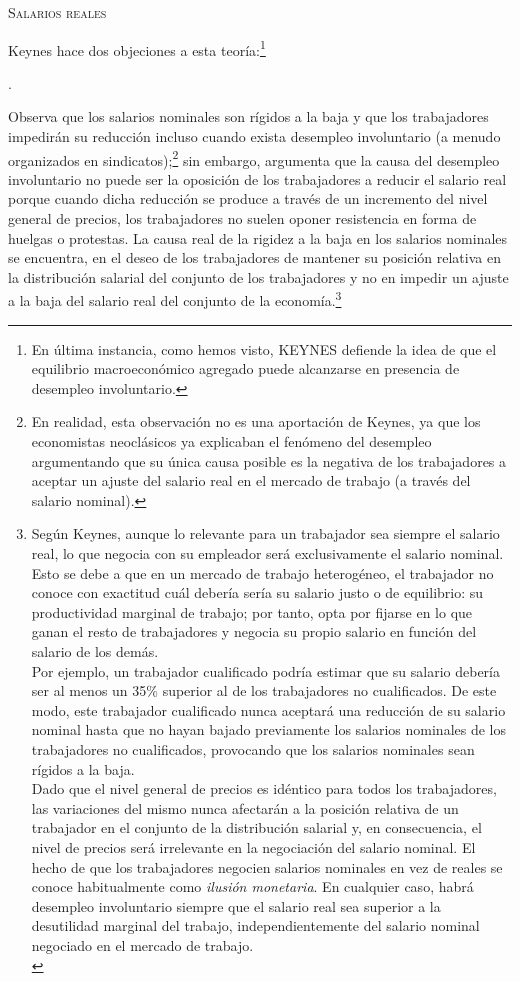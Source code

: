 \documentclass[10pt,a4paper]{article}
\newcounter{numitem}
\newenvironment{lnum}
      {\begin{list}{\arabic{numitem}.}{%
          \usecounter{numitem}%
          \setlength{\leftmargin}{1cm}%
          \setlength{\parskip}{3pt}%
          \setlength{\itemsep}{0pt}%
          \setlength{\parsep}{0pt}%
      }}
      {\end{list}}
\begin{document}
\textsc{Salarios reales}

Keynes hace dos objeciones a esta teoría:\footnote{%
    En última instancia, como hemos visto, KEYNES defiende la idea de que el equilibrio macroeconómico agregado puede alcanzarse en presencia de desempleo involuntario.
}
\begin{lnum}
    \item Observa que los salarios nominales son rígidos a la baja y que los trabajadores impedirán su reducción incluso cuando exista desempleo involuntario (a menudo organizados en sindicatos);\footnote{%
        En realidad, esta observación no es una aportación de Keynes, ya que los economistas neoclásicos ya explicaban el fenómeno del desempleo argumentando que su única causa posible es la negativa de los trabajadores a aceptar un ajuste del salario real en el mercado de trabajo (a través del salario nominal).
    } sin embargo, argumenta que la causa del desempleo involuntario no puede ser la oposición de los trabajadores a reducir el salario real porque cuando dicha reducción se produce a través de un incremento del nivel general de precios, los trabajadores no suelen oponer resistencia en forma de huelgas o protestas. La causa real de la rigidez a la baja en los salarios nominales se encuentra, en el deseo de los trabajadores de mantener su posición relativa en la distribución salarial del conjunto de los trabajadores y no en impedir un ajuste a la baja del salario real del conjunto de la economía.\footnote{%
        Según Keynes, aunque lo relevante para un trabajador sea siempre el salario real, lo que negocia con su empleador será exclusivamente el salario nominal. Esto se debe a que en un mercado de trabajo heterogéneo, el trabajador no conoce con exactitud cuál debería sería su salario justo o de equilibrio: su productividad marginal de trabajo; por tanto, opta por fijarse en lo que ganan el resto de trabajadores y negocia su propio salario en función del salario de los demás.\\
    Por ejemplo, un trabajador cualificado podría estimar que su salario debería ser al menos un 35\% superior al de los trabajadores no cualificados. De este modo, este trabajador cualificado nunca aceptará una reducción de su salario nominal hasta que no hayan bajado previamente los salarios nominales de los trabajadores no cualificados, provocando que los salarios nominales sean rígidos a la baja.\\
    Dado que el nivel general de precios es idéntico para todos los trabajadores, las variaciones del mismo nunca afectarán a la posición relativa de un trabajador en el conjunto de la distribución salarial y, en consecuencia, el nivel de precios será irrelevante en la negociación del salario nominal. El hecho de que los trabajadores negocien salarios nominales en vez de reales se conoce habitualmente como \textit{ilusión monetaria}. En cualquier caso, habrá desempleo involuntario siempre que el salario real sea superior a la desutilidad marginal del trabajo, independientemente del salario nominal negociado en el mercado de trabajo.\\
}
\end{lnum}
\end{document}
